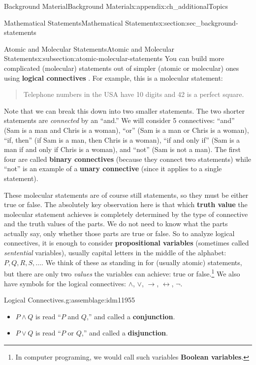 \documentclass[oneside,10pt,]{book}
\newcommand{\terminology}[1]{\textbf{#1}}
\numberwithin{equation}{chapter}
\def\iff{\leftrightarrow}
\def\imp{\rightarrow}
\begin{document}
\begin{appendixptx}{Background Material}{}{Background Material}{}{}{x:appendix:ch_additionalTopics}
\begin{sectionptx}{Mathematical Statements}{}{Mathematical Statements}{}{}{x:section:sec_background-statements}
\begin{subsectionptx}{Atomic and Molecular Statements}{}{Atomic and Molecular Statements}{}{}{x:subsection:atomic-molecular-statements}
You can build more complicated (molecular) statements out of simpler (atomic or molecular) ones using \terminology{logical connectives} . For example, this is a molecular statement:%
\begin{quote}%
Telephone numbers in the USA have 10 digits and 42 is a perfect square.%
\end{quote}
Note that we can break this down into two smaller statements. The two shorter statements are \emph{connected} by an ``and.'' We will consider 5 connectives: ``and'' (Sam is a man and Chris is a woman), ``or'' (Sam is a man or Chris is a woman), ``if\textellipsis{}, then\textellipsis{}'' (if Sam is a man, then Chris is a woman), ``if and only if'' (Sam is a man if and only if Chris is a woman), and ``not'' (Sam is not a man). The first four are called \terminology{binary connectives} (because they connect two statements) while ``not'' is an example of a \terminology{unary connective} (since it applies to a single statement).%
\par
These molecular statements are of course still statements, so they must be either true or false.  The absolutely key observation here is that which \terminology{truth value}  the molecular statement achieves is completely determined by the type of connective and the truth values of the parts. We do not need to know what the parts actually say, only whether those parts are true or false. So to analyze logical connectives, it is enough to consider \terminology{propositional variables} (sometimes called \emph{sentential} variables), usually capital letters in the middle of the alphabet: \(P, Q, R, S, \ldots\).  We think of these as standing in for (usually atomic) statements, but there are only two \emph{values} the variables can achieve: true or false.\footnote{In computer programing, we would call such variables \terminology{Boolean variables}.\label{g:fn:idm11945}} \label{g:notation:idm11947} We also have symbols for the logical connectives: \(\wedge\), \(\vee\), \(\imp\), \(\iff\), \(\neg\).%
\begin{assemblage}{Logical Connectives.}{g:assemblage:idm11955}%
%
\begin{itemize}[label=\textbullet]
\item{}\(P \wedge Q\) is read ``\(P\) and \(Q\),'' and called a \terminology{conjunction}.  \label{g:notation:idm11970}%
\item{}\(P \vee Q\) is read ``\(P\) or \(Q\),'' and called a \terminology{disjunction}.  \label{g:notation:idm11985}%

\end{itemize}
\end{assemblage}
\end{subsectionptx}
\end{sectionptx}
\end{appendixptx}
\end{document}
